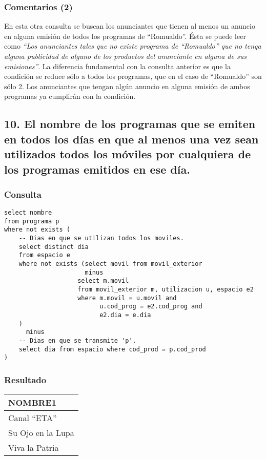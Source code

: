\subsubsection*{Comentarios (2)}
En esta otra consulta se buscan los anunciantes que tienen al menos un anuncio en alguna emisión de todos los programas de ``Romualdo''. Ésta se puede leer como \textit{``Los anunciantes tales que no existe programa de ``Romualdo'' que no tenga alguna publicidad de alguno de los productos del anunciante en alguna de sus emisiones''}. La diferencia fundamental con la consulta anterior es que la condición se reduce sólo a todos los programas, que en el caso de ``Romualdo'' son sólo 2. Los anunciantes que tengan algún anuncio en alguna emisión de ambos programas ya cumplirán con la condición. \\

\subsection*{10. \normalsize{El nombre de los programas que se emiten en todos los d\'ias en que al menos una vez sean utilizados todos los m\'oviles por cualquiera de los programas emitidos en ese d\'ia.}}

\subsubsection*{Consulta}
\begin{lstlisting} 
select nombre 
from programa p
where not exists (
    -- Dias en que se utilizan todos los moviles.
    select distinct dia 
    from espacio e
    where not exists (select movil from movil_exterior
                      minus
                    select m.movil
                    from movil_exterior m, utilizacion u, espacio e2
                    where m.movil = u.movil and 
                          u.cod_prog = e2.cod_prog and 
                          e2.dia = e.dia
    )
      minus
    -- Dias en que se transmite 'p'.
    select dia from espacio where cod_prod = p.cod_prod
)

\end{lstlisting}

\subsubsection*{Resultado}
\begin{tabular}{|l|}
  \hline
    \bf{NOMBRE1} \\ 
  \hline
    Canal ``ETA'' \\ 
    Su Ojo en la Lupa \\
    Viva la Patria \\ 
  \hline
\end{tabular} 

